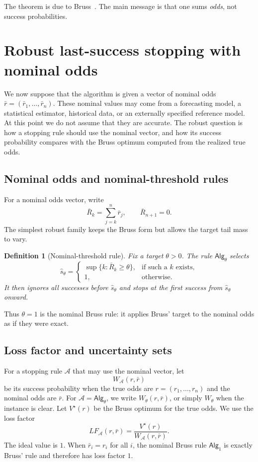 \documentclass[11pt,a4paper]{article}
\newtheorem{definition}{Definition}
\newcommand{\alg}{\mathsf{Alg}}
\begin{document}
The theorem is due to Bruss~\cite{Bruss2000}.  The main message is that one
sums \emph{odds}, not success probabilities.

\section{Robust last-success stopping with nominal odds}
\label{sec:prediction-framework}

We now suppose that the algorithm is given a vector of nominal odds
\(\bar r=(\bar r_1,\dots,\bar r_n)\).  These nominal values may come from a
forecasting model, a statistical estimator, historical data, or an externally
specified reference model.  At this point we do not assume that they are
accurate.  The robust question is how a stopping rule should use the nominal
vector, and how its success probability compares with the Bruss optimum computed
from the realized true odds.

\subsection{Nominal odds and nominal-threshold rules}

For a nominal odds vector, write
\[
  \bar R_k=\sum_{j=k}^n\bar r_j,
  \qquad
  \bar R_{n+1}=0.
\]
The simplest robust family keeps the Bruss form but allows the target tail mass
to vary.

\begin{definition}[Nominal-threshold rule]
\label{def:pred-rule}
Fix a target \(\theta>0\).  The rule \(\alg_\theta\) selects
\[
  \hat s_\theta=
  \begin{cases}
    \sup\{k:\bar R_k\ge \theta\}, & \text{if such a }k\text{ exists},\\
    1, & \text{otherwise}.
  \end{cases}
\]
It then ignores all successes before \(\hat s_\theta\) and stops at the first
success from \(\hat s_\theta\) onward.
\end{definition}

Thus \(\theta=1\) is the nominal Bruss rule: it applies Bruss' target to the
nominal odds as if they were exact.

\subsection{Loss factor and uncertainty sets}
\label{subsec:metrics}

For a stopping rule \(\mathcal A\) that may use the nominal vector, let
\[
  W_{\mathcal A}(r,\bar r)
\]
be its success probability when the true odds are \(r=(r_1,\dots,r_n)\) and the
nominal odds are \(\bar r\).  For \(\mathcal A=\alg_\theta\), we write
\(W_\theta(r,\bar r)\), or simply \(W_\theta\) when the instance is clear.  Let
\(V^\star(r)\) be the Bruss optimum for the true odds.  We use the loss factor
\[
  LF_{\mathcal A}(r,\bar r)
  =
  \frac{V^\star(r)}{W_{\mathcal A}(r,\bar r)}.
\]
The ideal value is \(1\).  When \(\bar r_i=r_i\) for all \(i\), the nominal
Bruss rule \(\alg_1\) is exactly Bruss' rule and therefore has loss factor \(1\).
\end{document}
